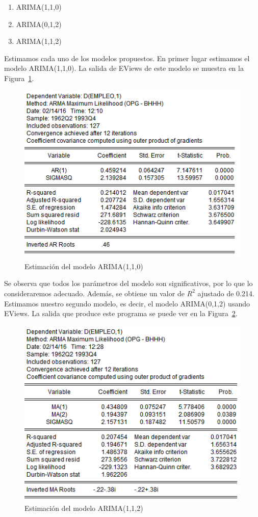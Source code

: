 \documentclass[12pt,a4paper,twoside,openright,titlepage,final]{article}
\begin{document}
\begin{enumerate}
	\item ARIMA(1,1,0) \label{mod:1}
	\item ARIMA(0,1,2) \label{mod:2}
	\item ARIMA(1,1,2) \label{mod:3}
\end{enumerate}

Estimamos cada uno de los modelos propuestos. En primer lugar estimamos el modelo ARIMA(1,1,0). La salida de EViews de este modelo se muestra en la Figura~\ref{fig:modelo1-estadisticas}.\\


\begin{figure}[tbph!]
	\centering
	\includegraphics[width=0.7\linewidth]{imagenes/empleo/modelo1-estadisticas.png}
	\caption{Estimación del modelo ARIMA(1,1,0)}
	\label{fig:modelo1-estadisticas}
\end{figure}

Se observa que todos los parámetros del modelo son significativos, por lo que lo consideraremos adecuado. Además, se obtiene un valor de $R^2$ ajustado de 0.214.\\

Estimamos nuestro segundo modelo, es decir, el modelo ARIMA(0,1,2) usando EViews. La salida que produce este programa se puede ver en la Figura~\ref{fig:modelo2-estadisticas}.\\

\begin{figure}[tbph!]
	\centering
	\includegraphics[width=0.7\linewidth]{imagenes/empleo/modelo2-estadisticas.png}
	\caption{Estimación del modelo ARIMA(1,1,2)}
	\label{fig:modelo2-estadisticas}
\end{figure}
\end{document}
